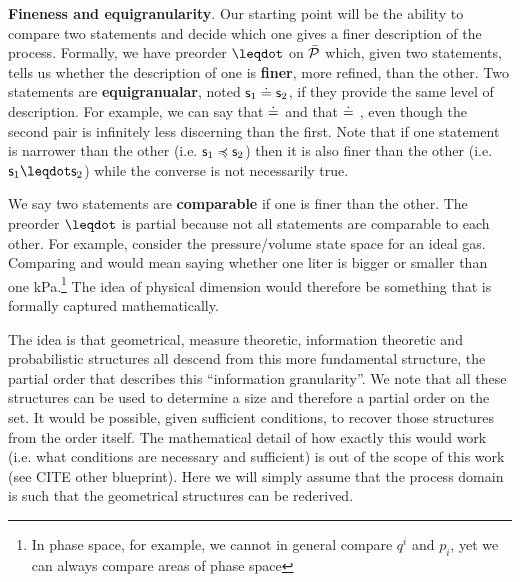\documentclass[10pt, onecolumn, longbibliography, nofootinbib]{revtex4-2}
\begin{document}
\textbf{Fineness and equigranularity}. Our starting point will be the ability to compare two statements and decide which one gives a finer description of the process. Formally, we have preorder $\finer$ on $\tdomain[P]$ which, given two statements, tells us whether the description of one is \textbf{finer}, more refined, than the other. Two statements are \textbf{equigranualar}, noted $\stmt_1 \eqgran \stmt_2$, if they provide the same level of description. For example, we can say that  $\eqgran$  and that  $\eqgran$ , even though the second pair is infinitely less discerning than the first. Note that if one statement is narrower than the other (i.e. $\stmt_1 \narrower \stmt_2$) then it is also finer than the other (i.e. $\stmt_1 \finer \stmt_2$) while the converse is not necessarily true. 

We say two statements are \textbf{comparable} if one is finer than the other. The preorder $\finer$ is partial because not all statements are comparable to each other. For example, consider the pressure/volume state space for an ideal gas. Comparing  and  would mean saying whether one liter is bigger or smaller than one kPa.\footnote{In phase space, for example, we cannot in general compare $q^i$ and $p_i$, yet we can always compare areas of phase space} The idea of physical dimension would therefore be something that is formally captured mathematically.

The idea is that geometrical, measure theoretic, information theoretic and probabilistic structures all descend from this more fundamental structure, the partial order that describes this ``information granularity''. We note that all these structures can be used to determine a size and therefore a partial order on the set. It would be possible, given sufficient conditions, to recover those structures from the order itself. The mathematical detail of how exactly this would work (i.e. what conditions are necessary and sufficient) is out of the scope of this work (see CITE other blueprint). Here we will simply assume that the process domain is such that the geometrical structures can be rederived.
\end{document}
